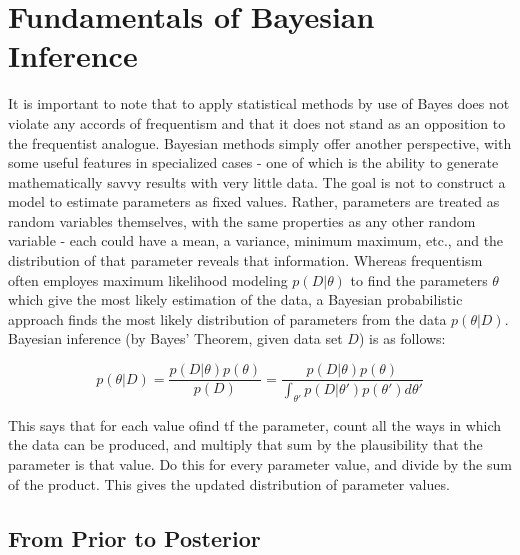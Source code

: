 \section{Fundamentals of Bayesian Inference} %

It is important to note that to apply statistical methods by use of Bayes does not violate any accords of frequentism and that it does not stand as an opposition to the frequentist analogue.  Bayesian methods simply offer another perspective, with some useful features in specialized cases - one of which is the ability to generate mathematically savvy results with very little data.  The goal is not to construct a model to estimate parameters as fixed values. Rather, parameters are treated as random variables themselves, with the same properties as any other random variable - each could have a mean, a variance, minimum maximum, etc., and the distribution of that parameter reveals that information.
Whereas frequentism often employes maximum likelihood modeling $p(D|\theta)$ to find the parameters $\theta$ which give the most likely estimation of the data, a Bayesian probabilistic approach finds the most likely distribution of parameters from the data $p(\theta|D)$\cite{mullachery2018bayesian}.  Bayesian inference (by Bayes' Theorem, given data set $D$) is as follows:

$$
p(\theta|D) = \frac{p(D|\theta)p(\theta)}{p(D)} = \frac{p(D|\theta)p(\theta)}{\int_{\theta'} p(D|\theta')p(\theta')d\theta'}
$$

This says that for each value ofind tf the parameter, count all the ways in which the data can be produced, and multiply that sum by the plausibility that the parameter is that value.  Do this for every parameter value, and divide by the sum of the product.  This gives the updated distribution of parameter values.


\subsection{From Prior to Posterior}

